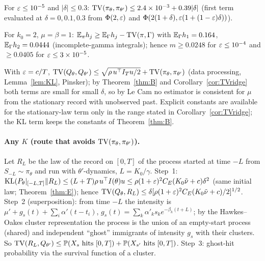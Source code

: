 \begin{corollary}[stationary law on the ridge, $k_0=2$, $\mu=\beta=1$]\label{cor:TVridge}\Ps{}
For $\varepsilon\le10^{-5}$ and $|\delta|\le0.3$: $\mathrm{TV}(\pi_\theta,\pi_{\theta'})\le2.4\times10^{-3}+0.39|\delta|$ (first term evaluated at $\delta=0,0.1,0.3$ from $\Phi(2,\varepsilon)$ and $\Phi(2(1+\delta),\varepsilon(1+(1-\varepsilon)\delta))$).
\end{corollary}

\begin{corollary}\label{cor:M}\Ps{}
For $k_0=2$, $\mu=\beta=1$: $\mathbb{E}_\pi h_j\ge\mathbb{E}_\Gamma h_j-\mathrm{TV}(\pi,\Gamma)$ with $\mathbb{E}_\Gamma h_1=0.164$, $\mathbb{E}_\Gamma h_2=0.0444$ (incomplete-gamma integrals); hence $m\ge0.0248$ for $\varepsilon\le10^{-4}$ and $\ge0.0405$ for $\varepsilon\le3\times10^{-5}$.
\end{corollary}

\begin{theorem}[impossibility for the stationary record, $K=1$, $k_0>1$]\label{thm:imp1}\Ps{}
With $\varepsilon=c/T$, $\mathrm{TV}(Q_\theta,Q_{\theta'})\le\sqrt{\rho\,u^{\top} I_Tu/2}+\mathrm{TV}(\pi_\theta,\pi_{\theta'})$ (data processing, Lemma~\ref{lem:KL}, Pinsker); by Theorem~\ref{thm:B} and Corollary~\ref{cor:TVridge} both terms are small for small $\delta$, so by Le Cam no estimator is consistent for $\mu$ from the stationary record with unobserved past. Explicit constants are available for the stationary-law term only in the range stated in Corollary~\ref{cor:TVridge}; the KL term keeps the constants of Theorem~\ref{thm:B}.
\end{theorem}

\paragraph{Any $K$ (route that avoids $\mathrm{TV}(\pi_\theta,\pi_{\theta'})$).}
Let $R_L$ be the law of the record on $[0,T]$ of the process started at time $-L$ from $S_{-L}\sim\pi_\theta$ and run with $\theta'$-dynamics, $L=K_0/\gamma$.
Step~1: $\mathrm{KL}(P_\theta|_{[-L,T]}\|R_L)\le(L+T)\rho\,u^{\top} I(\theta)u\le\rho(1+\varepsilon)^2C_E(K_0\tilde\nu+c)\delta^2$ (same initial law; Theorem~\ref{thm:E}); hence $\mathrm{TV}(Q_\theta,R_L)\le\delta[\rho(1+\varepsilon)^2C_E(K_0\tilde\nu+c)/2]^{1/2}$.
Step~2 (superposition): from time $-L$ the intensity is $\mu'+g_s(t)+\sum_i\alpha'(t-t_i)$, $g_s(t)=\sum_k\alpha'_ks_ke^{-\beta_k(t+L)}$; by the Hawkes--Oakes cluster representation the process is the union of an empty-start process (shared) and independent ``ghost'' immigrants of intensity $g_s$ with their clusters. So $\mathrm{TV}(R_L,Q_{\theta'})\le\mathbb{P}(X_s\text{ hits }[0,T])+\mathbb{P}(X_{s'}\text{ hits }[0,T])$.
Step~3: ghost-hit probability via the survival function of a cluster.

